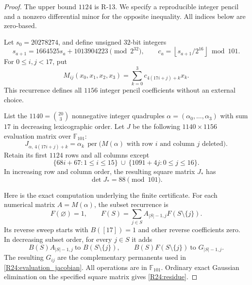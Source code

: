 \begin{proof}
The upper bound $1124$ is R-13. We specify a reproducible integer
pencil and a nonzero differential minor for the opposite inequality.
All indices below are zero-based.

Let $s_0=20278274$, and define unsigned $32$-bit integers
\[
 s_{a+1}=1664525s_a+1013904223\pmod{2^{32}},
 \qquad c_a=\left\lfloor s_{a+1}/2^{16}\right\rfloor\bmod101.
\]
For $0\leq i,j<17$, put
\[
 M_{ij}(x_0,x_1,x_2,x_3)
       =\sum_{k=0}^3c_{4(17i+j)+k}x_k.
\]
This recurrence defines all $1156$ integer pencil coefficients
without an external choice.

List the $1140=\binom{20}{3}$ nonnegative integer quadruples
$\alpha=(\alpha_0,\ldots,\alpha_3)$ with sum $17$ in decreasing
lexicographic order. Let $J$ be the following $1140\times1156$
evaluation matrix over $\mathbb F_{101}$:
\begin{equation}\label{R24:evaluation_jacobian}
 J_{\alpha,\,4(17i+j)+k}
 =\alpha_k\,\operatorname{per}
             \big(M(\alpha)\text{ with row }i
                               \text{ and column }j\text{ deleted}\big).
\end{equation}
Retain its first $1124$ rows and all columns except
\begin{equation}\label{R24:omitted_columns}
 \{68i+67:1\leq i\leq15\}
 \ \cup\
 \{1091+4j:0\leq j\leq16\}.
\end{equation}
In increasing row and column order, the resulting square matrix
$J_*$ has
\begin{equation}\label{R24:residue}
 \det J_*=88\pmod{101}.
\end{equation}

Here is the exact computation underlying the finite certificate.
For each numerical matrix $A=M(\alpha)$, the subset recurrence is
\[
 F(\varnothing)=1,\qquad
 F(S)=\sum_{j\in S}A_{|S|-1,j}F(S\setminus\{j\}).
\]
Its reverse sweep starts with $B([17])=1$ and other reverse
coefficients zero. In decreasing subset order, for every $j\in S$
it adds
\[
 B(S)A_{|S|-1,j}\ \text{to }B(S\setminus\{j\}),\qquad
 B(S)F(S\setminus\{j\})\ \text{to }G_{|S|-1,j}.
\]
The resulting $G_{ij}$ are the complementary permanents used in
\eqref{R24:evaluation_jacobian}. All operations are in
$\mathbb F_{101}$. Ordinary exact Gaussian elimination on the
specified square matrix gives \eqref{R24:residue}.


\end{proof}
